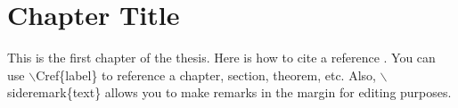 
\chapter{Chapter Title} \label{label}

This is the first chapter of the thesis. Here is how to cite a reference \cite{thissen}. You can use $\backslash$Cref\{label\}  to reference a chapter, section, theorem, etc. Also, $\backslash$sideremark\{text\}  allows you to make remarks in the margin for editing purposes. 
